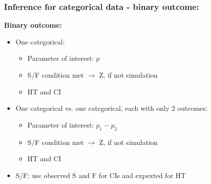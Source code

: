 \documentclass[slidestop,compress,mathserif,12pt,t,professionalfonts,xcolor=table]{beamer}
\begin{document}
\begin{frame}
\frametitle{Inference for categorical data - binary outcome:}

\textbf{Binary outcome:}

\pause

\begin{itemize}

\item One categorical: \\
\begin{itemize}
\item Parameter of interest: $p$
\item S/F condition met $\rightarrow$ Z, if not simulation
\item HT and CI
\end{itemize}

\pause

\item One categorical vs. one categorical, each with only 2 outcomes: \\
\begin{itemize}
\item Parameter of interest: $p_1 - p_2$
\item S/F condition met $\rightarrow$ Z, if not simulation
\item HT and CI
\end{itemize}

\pause

\item S/F: use observed S and F for CIs and expexted for HT

\end{itemize}

\end{frame}

\end{document}
